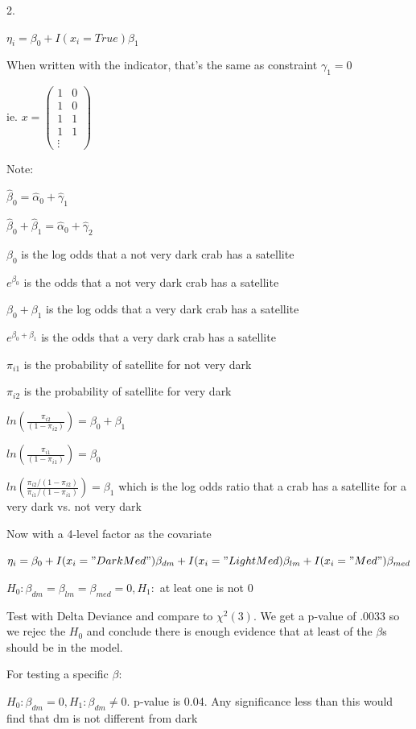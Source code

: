 \documentclass{article}
\begin{document}
2. 

$\eta_i = \beta_0 + I(x_i = True)\beta_1$

When written with the indicator, that's the same as constraint $\gamma_1 = 0$

ie. $x = \begin{pmatrix}
    1 & 0 \\ 1 & 0 \\ 1 & 1 \\ 1 & 1 \\ \vdots
\end{pmatrix}$


Note:

$\hat{\beta}_0 = \hat{\alpha}_0 + \hat{\gamma}_1$

$\hat{\beta}_0 + \hat{\beta}_1 = \hat{\alpha}_0 + \hat{\gamma}_2$

$\beta_0$ is the log odds that a not very dark crab has a satellite

$e^{\beta_0}$ is the odds that a not very dark crab has a satellite

$\beta_0 + \beta_1$ is the log odds that a very dark crab has a satellite

$e^{\beta_0 + \beta_1}$ is the odds that a very dark crab has a satellite


$\pi_{i1}$ is the probability of satellite for not very dark

$\pi_{i2}$ is the probability of satellite for very dark

$ln(\frac{\pi_{i2}}{(1-\pi_{i2})}) = \beta_0 + \beta_1$

$ln(\frac{\pi_{i1}}{(1-\pi_{i1})}) = \beta_0$

$ln(\frac{\pi_{i2}/(1-\pi_{i2})}{\pi_{i1}/(1-\pi_{i1})}) = \beta_1$ which is the log odds ratio that a crab has a satellite for a very dark vs. not very dark

Now with a 4-level factor as the covariate

$\eta_i = \beta_0 + I(x_i="DarkMed")\beta_{dm} + I(x_i="LightMed)\beta_{lm} + I(x_i="Med")\beta_{med}$

$H_0: \beta_{dm} = \beta_{lm} = \beta_{med} = 0, H_1:$ at leat one is not 0

Test with Delta Deviance and compare to $\chi^2(3)$. We get a p-value of .0033 so we rejec the $H_0$ and conclude there is enough evidence that at least of the $\beta$s should be in the model. 

For testing a specific $\beta$:

$H_0: \beta_{dm} = 0, H_1: \beta_{dm} \neq 0$. p-value is 0.04. Any significance less than this would find that dm is not different from dark
\end{document}
